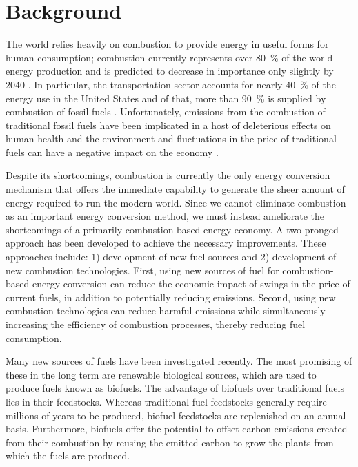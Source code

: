 \documentclass[../main.tex]{subfiles}
\begin{document}
\label{sec:intro-introduction}

\section{Background}

The world relies heavily on combustion to provide energy in useful forms for
human consumption; combustion currently represents over \SI{80}{\percent} of the world
energy production \cite{Sims2007} and is predicted to decrease in importance
only slightly by 2040 \cite{EIA2013}. In particular, the transportation sector
accounts for nearly \SI{40}{\percent} of the energy use in the United States and of that,
more than \SI{90}{\percent} is supplied by combustion of fossil fuels \cite{MER2013}.
Unfortunately, emissions from the combustion of traditional fossil fuels have
been implicated in a host of deleterious effects on human health and the
environment \cite{Avakian2002} and fluctuations in the price of traditional
fuels can have a negative impact on the economy \cite{Owen2010}.

Despite its shortcomings, combustion is currently the only energy conversion
mechanism that offers the immediate capability to generate the sheer amount
of energy required to run the modern world. Since we cannot eliminate
combustion as an important energy conversion method, we must instead ameliorate
the shortcomings of a primarily combustion-based energy economy. A two-pronged
approach has been developed to achieve the necessary improvements. These approaches
include: 1) development of new fuel sources and 2) development of new
combustion technologies. First, using new sources of fuel for combustion-based
energy conversion can reduce the economic impact of swings in the price of
current fuels, in addition to potentially reducing emissions. Second, using new
combustion technologies can reduce harmful emissions while simultaneously
increasing the efficiency of combustion processes, thereby reducing fuel
consumption.

Many new sources of fuels have been investigated recently. The most promising
of these in the long term are renewable biological sources, which are used to
produce fuels known as biofuels. The advantage of biofuels over traditional
fuels lies in their feedstocks. Whereas traditional fuel feedstocks generally
require millions of years to be produced, biofuel feedstocks are replenished
on an annual basis. Furthermore, biofuels offer the potential to offset carbon
emissions created from their combustion by reusing the emitted carbon to grow
the plants from which the fuels are produced.
\end{document}
